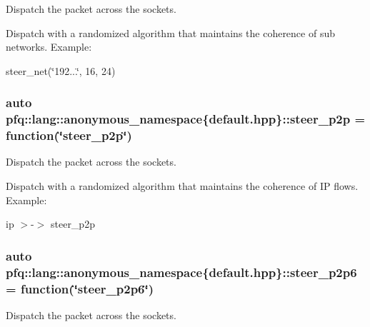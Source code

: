 Dispatch the packet across the sockets. 

Dispatch with a randomized algorithm that maintains the coherence of sub networks. Example\+:

steer\+\_\+net(\char`\"{}192...\char`\"{}, 16, 24) 
\subsubsection[{\texorpdfstring{steer\+\_\+p2p}{steer_p2p}}]{\setlength{\rightskip}{0pt plus 5cm}auto pfq\+::lang\+::anonymous\+\_\+namespace\{default.\+hpp\}\+::steer\+\_\+p2p = {\bf function}(\char`\"{}steer\+\_\+p2p\char`\"{})}\hypertarget{namespacepfq_1_1lang_1_1anonymous__namespace_02default_8hpp_03_a93e5f91a2b955269de017225cf62e711}{}\label{namespacepfq_1_1lang_1_1anonymous__namespace_02default_8hpp_03_a93e5f91a2b955269de017225cf62e711}


Dispatch the packet across the sockets. 

Dispatch with a randomized algorithm that maintains the coherence of IP flows. Example\+:

ip $>$-\/$>$ steer\+\_\+p2p 
\subsubsection[{\texorpdfstring{steer\+\_\+p2p6}{steer_p2p6}}]{\setlength{\rightskip}{0pt plus 5cm}auto pfq\+::lang\+::anonymous\+\_\+namespace\{default.\+hpp\}\+::steer\+\_\+p2p6 = {\bf function}(\char`\"{}steer\+\_\+p2p6\char`\"{})}\hypertarget{namespacepfq_1_1lang_1_1anonymous__namespace_02default_8hpp_03_a53212b58bc49e8eab255da084295b015}{}\label{namespacepfq_1_1lang_1_1anonymous__namespace_02default_8hpp_03_a53212b58bc49e8eab255da084295b015}


Dispatch the packet across the sockets. 

